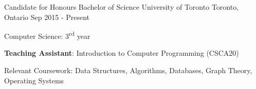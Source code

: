 \newcommand{\ts}{\textsuperscript}

\begin{cventries}
  \cventry
    {Candidate for Honours Bachelor of Science}
    {University of Toronto}
    {Toronto, Ontario}
    {Sep 2015 - Present}
    {
      \begin{cvitems}
        \item {Computer Science: 3\ts{rd} year}
        \item {\textbf{Teaching Assistant}: Introduction to Computer Programming (CSCA20)}
        \item {Relevant Coursework: Data Structures, Algorithms, Databases, Graph Theory, Operating Systems}
      \end{cvitems}
    }

\end{cventries}
